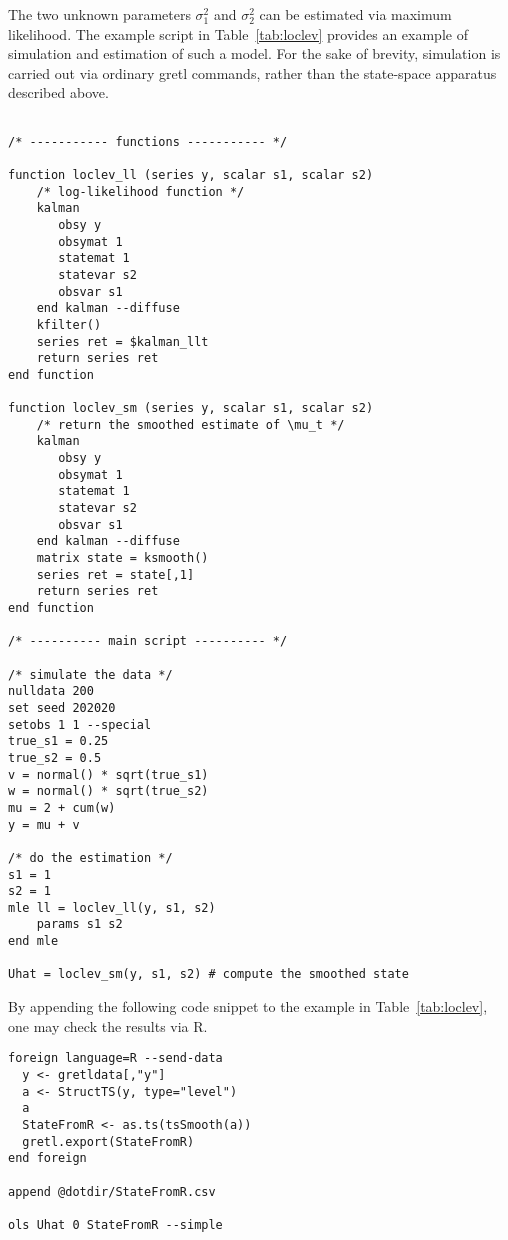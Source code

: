 \documentclass[a4paper]{article}
\begin{document}
The two unknown parameters $\sigma^2_1$ and $\sigma^2_2$ can be
estimated via maximum likelihood.  The example script in
Table~\ref{tab:loclev} provides an example of simulation and
estimation of such a model. For the sake of brevity, simulation is
carried out via ordinary gretl commands, rather than the state-space
apparatus described above.

\begin{table}[htbp]
  \caption{Local level model}
  \label{tab:loclev}

\begin{small}
\begin{verbatim}

/* ----------- functions ----------- */

function loclev_ll (series y, scalar s1, scalar s2)
    /* log-likelihood function */
    kalman
       obsy y
       obsymat 1
       statemat 1
       statevar s2
       obsvar s1
    end kalman --diffuse
    kfilter()
    series ret = $kalman_llt
    return series ret
end function

function loclev_sm (series y, scalar s1, scalar s2)
    /* return the smoothed estimate of \mu_t */
    kalman
       obsy y
       obsymat 1
       statemat 1
       statevar s2
       obsvar s1
    end kalman --diffuse
    matrix state = ksmooth()
    series ret = state[,1]
    return series ret
end function

/* ---------- main script ---------- */

/* simulate the data */
nulldata 200
set seed 202020
setobs 1 1 --special
true_s1 = 0.25
true_s2 = 0.5
v = normal() * sqrt(true_s1)
w = normal() * sqrt(true_s2)
mu = 2 + cum(w)
y = mu + v

/* do the estimation */
s1 = 1
s2 = 1
mle ll = loclev_ll(y, s1, s2)
    params s1 s2
end mle

Uhat = loclev_sm(y, s1, s2) # compute the smoothed state
\end{verbatim}
\end{small}
\end{table}

By appending the following code snippet to the example in
Table~\ref{tab:loclev}, one may check the results via \textsf{R}.

\begin{verbatim}
foreign language=R --send-data
  y <- gretldata[,"y"]
  a <- StructTS(y, type="level")
  a
  StateFromR <- as.ts(tsSmooth(a))
  gretl.export(StateFromR)
end foreign

append @dotdir/StateFromR.csv

ols Uhat 0 StateFromR --simple
\end{verbatim}
\end{document}
